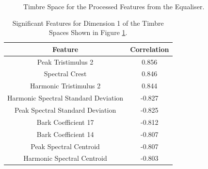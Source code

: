 		\begin{figure}[h!]
			\centering
			\qquad
			\caption{Timbre Space for the Processed Features from the Equaliser.}
			\label{fig:EqualiserProcessedMDSs}
		\end{figure}

		\begin{table}[h!]
			\centering
			\begin{tabular}{|c|c|}
				\hline
				\bf{Feature} & \bf{Correlation} \\
				\hline
				\hline
				Peak Tristimulus 2 &  0.856 \\
				\hline
				Spectral Crest &  0.846 \\
				\hline
				Harmonic Tristimulus 2 &  0.844 \\
				\hline
				Harmonic Spectral Standard Deviation & -0.827 \\
				\hline
				Peak Spectral Standard Deviation & -0.825 \\
				\hline
				Bark Coefficient 17 & -0.812 \\
				\hline
				Bark Coefficient 14 & -0.807 \\
				\hline
				Peak Spectral Centroid & -0.807 \\
				\hline
				Harmonic Spectral Centroid & -0.803 \\
				\hline
			\end{tabular}
			\caption{Significant Features for Dimension 1 of the Timbre Spaces Shown in Figure 
				 \ref{fig:EqualiserProcessedMDSs}.}
			\label{tab:EqualiserProcessedFeaturesDim1}
		\end{table}

